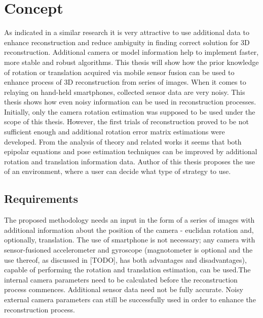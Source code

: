 
\chapter{Concept} %
As indicated in a similar research it is very attractive to use additional data to enhance reconstruction and reduce ambiguity in finding correct solution for 3D reconstruction. Additional camera or model information help to implement faster, more stable and robust algorithms. This thesis will show how the prior knowledge of rotation or translation acquired via mobile sensor fusion can be used to enhance process of 3D reconstruction from series of images. When it comes to relaying on hand-held smartphones, collected sensor data are very noisy. This thesis shows how even noisy information can be used in reconstruction processes. Initially, only the camera rotation estimation was supposed to be used under the scope of this thesis. However, the first trials of reconstruction proved to be not sufficient enough and additional rotation error matrix estimations were developed.
From the analysis of theory and related works it seems that both epipolar equations and pose estimation techniques can be improved by additional rotation and translation information data.  Author of this thesis proposes the use of an environment, where a user can decide what type of strategy to use.
\section{Requirements}
The proposed methodology needs an input in the form of a series of images with additional information about the position of the camera - euclidan rotation and, optionally, translation. The use of smartphone is not necessary; any camera with sensor-fusioned accelerometer and gyroscope (magnotometer is optional and the use thereof, as discussed in [TODO], has both advantages and disadvantages), capable of performing the rotation and translation estimation, can be used.The internal camera parameters need to be calculated before the reconstruction process commences. Additional sensor data need not be fully accurate. Noisy external camera parameters can still be successfully used in order to enhance the reconstruction process.
